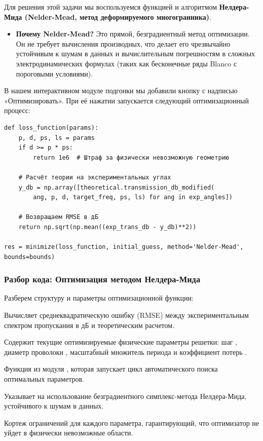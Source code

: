 Для решения этой задачи мы воспользуемся функцией  и алгоритмом \textbf{Нелдера-Мида (Nelder-Mead, метод деформируемого многогранника)}.
\begin{itemize}
    \item \textbf{Почему Nelder-Mead?} Это прямой, безградиентный метод оптимизации. Он не требует вычисления производных, что делает его чрезвычайно устойчивым к шумам в данных и вычислительным погрешностям в сложных электродинамических формулах (таких как бесконечные ряды Blanco с пороговыми условиями).
\end{itemize}

В нашем интерактивном модуле подгонки мы добавили кнопку  с надписью «Оптимизировать». При её нажатии запускается следующий оптимизационный процесс:
\begin{verbatim}
def loss_function(params):
    p, d, ps, ls = params
    if d >= p * ps:
        return 1e6  # Штраф за физически невозможную геометрию
    
    # Расчёт теории на экспериментальных углах
    y_db = np.array([theoretical.transmission_db_modified(
        ang, p, d, target_freq, ps, ls) for ang in exp_angles])
    
    # Возвращаем RMSE в дБ
    return np.sqrt(np.mean((exp_trans_db - y_db)**2))

res = minimize(loss_function, initial_guess, method='Nelder-Mead', bounds=bounds)
\end{verbatim}

\subsubsection{Разбор кода: Оптимизация методом Нелдера-Мида}

Разберем структуру и параметры оптимизационной функции:

\begin{syntaxdesc}
    \item[Целевая функция \mycode{loss_function(params)}] Вычисляет среднеквадратическую ошибку (RMSE) между экспериментальным спектром пропускания в дБ и теоретическим расчетом.
    \item[Вектор параметров \mycode{params}] Содержит текущие оптимизируемые физические параметры решетки: шаг , диаметр проволоки , масштабный множитель периода  и коэффициент потерь .
    \item[Функция оптимизации \mycode{minimize}] Функция из модуля , которая запускает цикл автоматического поиска оптимальных параметров.
    \item[Метод оптимизации \mycode{method='Nelder-Mead'}] Указывает на использование безградиентного симплекс-метода Нелдера-Мида, устойчивого к шумам в данных.
    \item[Граничные условия \mycode{bounds}] Кортеж ограничений для каждого параметра, гарантирующий, что оптимизатор не уйдет в физически невозможные области.
\end{syntaxdesc}

